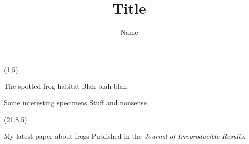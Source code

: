 \documentclass[final]{beamer}
\title{Title}
\author{Name}
\date{}
\begin{document}
\begin{frame}{}

\begin{textblock}{19.5}(1,5)
\begin{block}{The spotted frog habitat}
Blah blah blah
\end{block}

\begin{block}{Some interesting specimens}
Stuff and nonsense
\end{block}
\end{textblock}

\begin{textblock}{19.3}(21.8,5)
\begin{block}{My latest paper about frogs}
Published in the \emph{Journal of Irreproducible Results}.
\end{block}

\end{textblock}

\end{frame}
\end{document}

